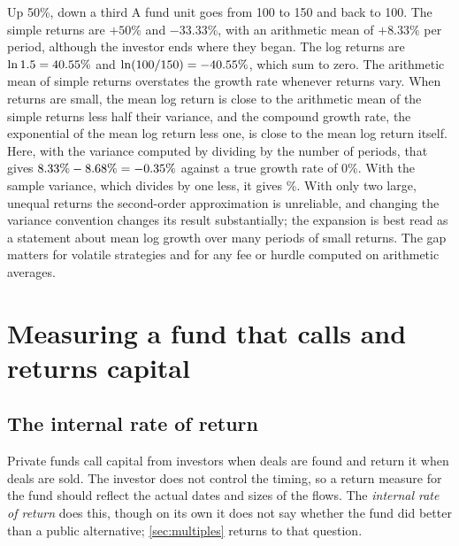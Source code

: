 \begin{chapterrefs}
\begin{example}{Up 50\%, down a third}\label{ex:updown}
A fund unit goes from 100 to 150 and back to 100. The simple returns are $+50\%$ and $-33.33\%$, with
an arithmetic mean of $+8.33\%$ per period, although the investor ends where they began. The log
returns are $\ln 1.5 = 40.55\%$ and $\ln(100/150) = -40.55\%$, which sum to zero. The arithmetic
mean of simple returns overstates the growth rate whenever returns vary. When returns are small,
the mean log return is close to the arithmetic mean of the simple returns less half their variance,
and the compound growth rate, the exponential of the mean log return less one, is close to the mean
log return itself. Here,
with the variance computed by dividing by the number of periods, that gives
$8.33\%-8.68\%=-0.35\%$ against a true growth rate of 0\%. With the sample variance, which divides by one less, it gives
\udApproxSample\%. With only two large, unequal returns the second-order approximation is unreliable, and changing
the variance convention changes its result substantially; the expansion is best read as a statement
about mean log growth over many periods of small returns.
The gap matters for volatile strategies and for any fee or hurdle computed on arithmetic averages.
\end{example}

\FloatBarrier
\section{Measuring a fund that calls and returns capital}
\label{sec:irr}

\subsection{The internal rate of return}

Private funds call capital from investors when deals are found and return it when deals are sold.
The investor does not control the timing, so a return measure for the fund should reflect the actual
dates and sizes of the flows. The \emph{internal rate of return} does this, though on its own it
does not say whether the fund did better than a public alternative; \cref{sec:multiples} returns to
that question.


\end{chapterrefs}
